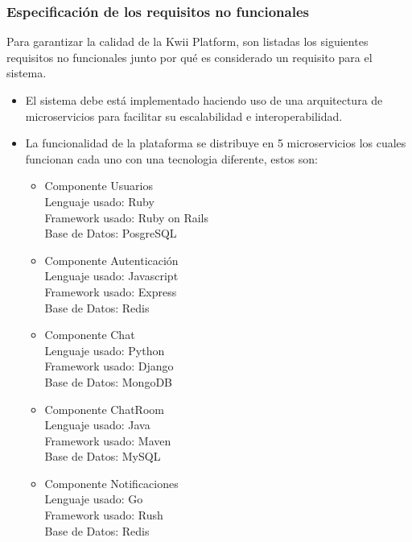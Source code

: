 \subsubsection{Especificación de los requisitos no funcionales}
Para garantizar la calidad de la Kwii Platform, son listadas los siguientes requisitos no funcionales junto por qué es considerado un requisito para el sistema.
\begin{itemize}
    \item El sistema debe está implementado haciendo uso de una arquitectura de microservicios para facilitar su escalabilidad e interoperabilidad.
    \item La funcionalidad de la plataforma se distribuye en 5 microservicios los cuales funcionan cada uno con una tecnologia diferente, estos son:
    \begin{itemize}
        \item Componente Usuarios \\
        Lenguaje usado: Ruby \\
        Framework usado: Ruby on Rails \\
        Base de Datos: PosgreSQL
        
        \item Componente Autenticación \\
        Lenguaje usado: Javascript \\
        Framework usado: Express \\
        Base de Datos: Redis
        
        \item Componente Chat \\
        Lenguaje usado: Python \\
        Framework usado: Django \\
        Base de Datos: MongoDB
        
        \item Componente ChatRoom \\
        Lenguaje usado: Java \\
        Framework usado: Maven \\
        Base de Datos: MySQL
        
        \item Componente Notificaciones \\
        Lenguaje usado: Go \\
        Framework usado: Rush \\
        Base de Datos: Redis
    \end{itemize}
\end{itemize}
